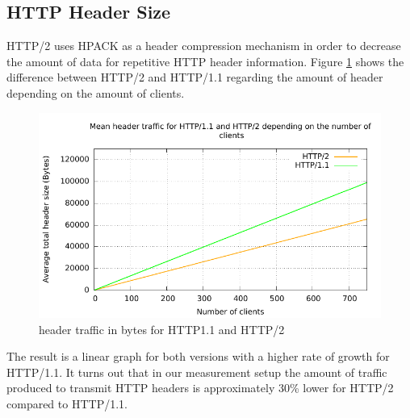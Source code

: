 \subsection{HTTP Header Size}
\label{subsec:header_size}

HTTP/2 uses HPACK \cite{hpack} as a header compression mechanism in order to decrease the amount of data for repetitive HTTP header information. Figure \ref{fig:headersize} shows the difference between HTTP/2 and HTTP/1.1 regarding the amount of header depending on the amount of clients.

\begin{figure}[H]
	\centering
	\includegraphics[scale=1,trim=0.0cm .0cm .0cm .0cm,clip]{images/headertraffic.pdf}
	\caption{header traffic in bytes for HTTP1.1 and HTTP/2}
	\label{fig:headersize}
\end{figure}

The result is a linear graph for both versions with a higher rate of growth for HTTP/1.1. It turns out that in our measurement setup the amount of traffic produced to transmit HTTP headers is approximately 30\% lower for HTTP/2 compared to HTTP/1.1. 
